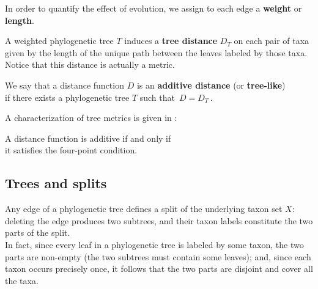 \documentclass[./main.tex]{subfiles}
\begin{document}

\begin{figure}[h]
\end{figure}

In order to quantify the effect of evolution, we assign to each edge a \textbf{weight} or \textbf{length}.\footnotemark


A weighted phylogenetic tree $T$ induces a \textbf{tree distance} $D_T$ on each pair of taxa given by the length of the unique path between the leaves labeled by those taxa. Notice that this distance is actually a metric.

We say that a distance function $D$ is an \textbf{additive distance} (or \textbf{tree-like}) \\
\bsp if there exists a phylogenetic tree $T$ such that $\, D = D_T \,$.

A characterization of tree metrics is given in \cite{Bun74}:
\begin{remarklike}[Fact]
    A distance function is additive if and only if \\
    \bsp it satisfies the four-point condition.
\end{remarklike}

\clearpage


\subsection*{Trees and splits}

Any edge of a phylogenetic tree defines a split of the underlying taxon set $X$: deleting the edge produces two subtrees, and their taxon labels constitute the two parts of the split. \\
In fact, since every leaf in a phylogenetic tree is labeled by some taxon, the two parts are non-empty (the two subtrees must contain some leaves); and, since each taxon occurs precisely once, it follows that the two parts are disjoint and cover all the taxa.
\end{document}
